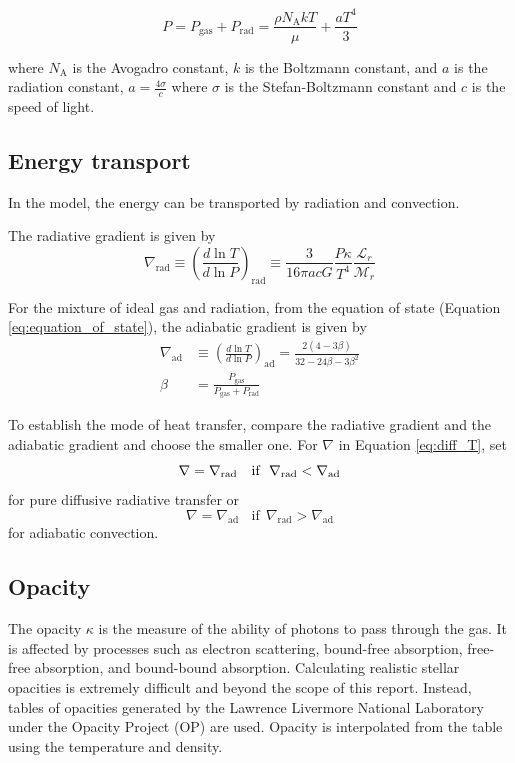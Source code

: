 \documentclass[twocolumn]{aastex631}
\begin{document}
\begin{equation}
	P=P_{\mathrm{gas}}+P_{\mathrm{rad}}=\frac{\rho N_{\mathrm{A}} k T}{\mu}+\frac{a T^4}{3}
	\label{eq:equation_of_state}
\end{equation}

where $N_{\mathrm{A}}$ is the Avogadro constant, $k$ is the Boltzmann constant, and $a$ is the radiation constant, $a = \frac{4 \sigma}{c}$ where $\sigma$ is the Stefan-Boltzmann constant and $c$ is the speed of light.

\subsection{Energy transport}
\label{subsec:energy_transport}
In the model, the energy can be transported by radiation and convection. 

The radiative gradient is given by
\begin{equation}
	\nabla_{\mathrm{rad}} \equiv\left(\frac{d \ln T}{d \ln P}\right)_{\mathrm{rad}} \equiv \frac{3}{16 \pi a c G} \frac{P \kappa}{T^4} \frac{\mathcal{L}_r}{\mathcal{M}_r}
\end{equation}

For the mixture of ideal gas and radiation, from the equation of state (Equation \ref{eq:equation_of_state}), the adiabatic gradient is given by
\begin{align}
	\nabla_{\mathrm{ad}} & \equiv\left(\frac{d \ln T}{d \ln P}\right)_{\mathrm{ad}}=\frac{2(4-3\beta)}{32-24\beta-3\beta^2} \\
	\beta & = \frac{P_{\mathrm{gas}}}{P_{\mathrm{gas}} + P_{\mathrm{rad}}}
\end{align}

To establish the mode of heat transfer, compare the radiative gradient and the adiabatic gradient and choose the smaller one. For $\nabla$ in Equation \ref{eq:diff_T}, set
\begin{equation}
	\nabla = \nabla_{\mathrm{rad}} ~~~ \text{if} ~~ \nabla_{\mathrm{rad}} < \nabla_{\mathrm{ad}} \\
	\label{eq:diff_rad_transfer}
\end{equation}
for pure diffusive radiative transfer or
\begin{equation}
	\nabla = \nabla_{\mathrm{ad}} ~~~~ \text{if} ~~ \nabla_{\mathrm{rad}} > \nabla_{\mathrm{ad}}
	\label{eq:ad_convection_transfer}
\end{equation}
for adiabatic convection.

\subsection{Opacity}
\label{subsec:opacity}
The opacity $\kappa$ is the measure of the ability of photons to pass through the gas. It is affected by processes such as electron scattering, bound-free absorption, free-free absorption, and bound-bound absorption. Calculating realistic stellar opacities is extremely difficult and beyond the scope of this report. Instead, tables of opacities generated by the Lawrence Livermore National Laboratory under the Opacity Project (OP) \cite{article:OPAL} are used. Opacity is interpolated from the table using the temperature and density.
\end{document}
